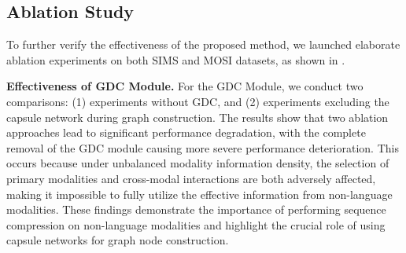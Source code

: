 \documentclass[letterpaper]{article} %
\begin{document}
\begin{table}[t]
\setlength{\tabcolsep}{2pt}
\centering
\small
{}
\caption{Ablation study results of MODS's components on SIMS and MOSI datasets.}
\label{tab_mods_module_ablation}
\end{table}






\subsection{Ablation Study}
To further verify the effectiveness of the proposed method, we launched elaborate ablation experiments on both SIMS and MOSI datasets, as shown in .

\noindent \textbf{Effectiveness of GDC Module.} For the GDC Module, we conduct two comparisons: (1) experiments without GDC, and (2) experiments excluding the capsule network during graph construction. The results show that two ablation approaches lead to significant performance degradation, with the complete removal of the GDC module causing more severe performance deterioration. This occurs because under unbalanced modality information density, the selection of primary modalities and cross-modal interactions are both adversely affected, making it impossible to fully utilize the effective information from non-language modalities. These findings demonstrate the importance of performing sequence compression on non-language modalities and highlight the crucial role of using capsule networks for graph node construction. 
\end{document}
